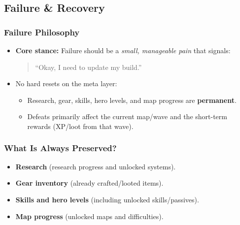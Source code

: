 
\subsection{Failure \& Recovery}

\subsubsection*{Failure Philosophy}

\begin{itemize}
	\item \textbf{Core stance:} Failure should be a \emph{small, manageable pain} that signals:
	\begin{quote}
		“Okay, I need to update my build.”
	\end{quote}
	\item No hard resets on the meta layer:
	\begin{itemize}
		\item Research, gear, skills, hero levels, and map progress are \textbf{permanent}.
		\item Defeats primarily affect the current map/wave and the short-term rewards (XP/loot from that wave).
	\end{itemize}
\end{itemize}

\subsubsection*{What Is Always Preserved?}

\begin{itemize}
	\item \textbf{Research} (research progress and unlocked systems).
	\item \textbf{Gear inventory} (already crafted/looted items).
	\item \textbf{Skills and hero levels} (including unlocked skills/passives).
	\item \textbf{Map progress} (unlocked maps and difficulties).
\end{itemize}


